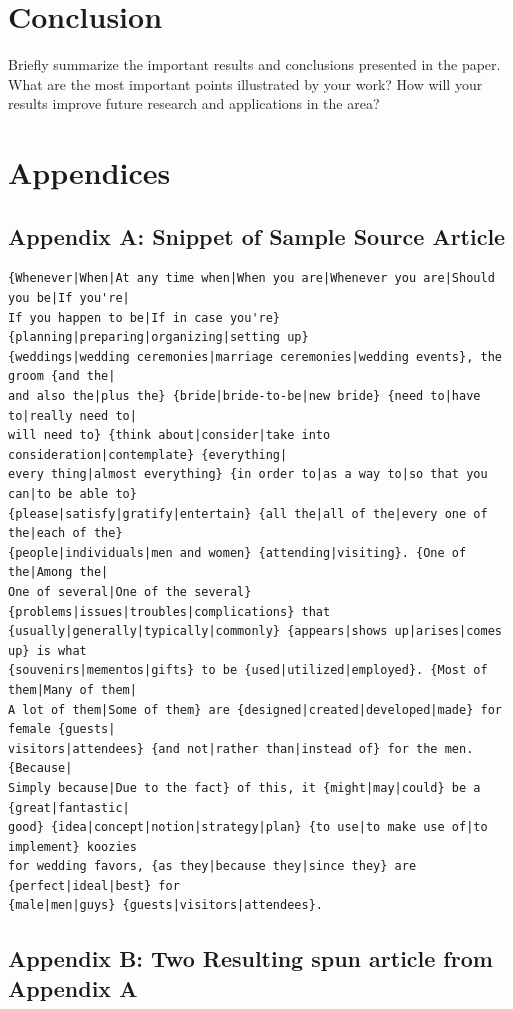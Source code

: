 \documentclass[11pt,letterpaper,oneside, titlepage]{scrartcl}
\begin{document}
\section{Conclusion}

Briefly summarize the important results and conclusions presented in the paper. What are the most important points illustrated by your work? How will your results improve future research and applications in the area?

\section{Appendices}

\subsection{Appendix A: Snippet of Sample Source Article}

\begin{verbatim}{Whenever|When|At any time when|When you are|Whenever you are|Should you be|If you're|
If you happen to be|If in case you're} {planning|preparing|organizing|setting up} 
{weddings|wedding ceremonies|marriage ceremonies|wedding events}, the groom {and the|
and also the|plus the} {bride|bride-to-be|new bride} {need to|have to|really need to|
will need to} {think about|consider|take into consideration|contemplate} {everything|
every thing|almost everything} {in order to|as a way to|so that you can|to be able to}
{please|satisfy|gratify|entertain} {all the|all of the|every one of the|each of the}
{people|individuals|men and women} {attending|visiting}. {One of the|Among the|
One of several|One of the several} {problems|issues|troubles|complications} that 
{usually|generally|typically|commonly} {appears|shows up|arises|comes up} is what 
{souvenirs|mementos|gifts} to be {used|utilized|employed}. {Most of them|Many of them|
A lot of them|Some of them} are {designed|created|developed|made} for female {guests|
visitors|attendees} {and not|rather than|instead of} for the men. {Because|
Simply because|Due to the fact} of this, it {might|may|could} be a {great|fantastic|
good} {idea|concept|notion|strategy|plan} {to use|to make use of|to implement} koozies
for wedding favors, {as they|because they|since they} are {perfect|ideal|best} for 
{male|men|guys} {guests|visitors|attendees}.
\end{verbatim}
 
\subsection{Appendix B: Two Resulting spun article from Appendix A}
\end{document}
